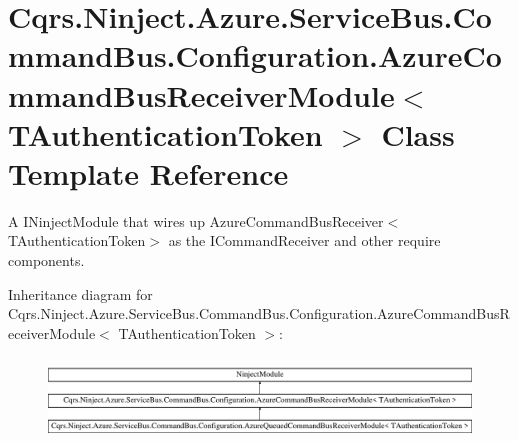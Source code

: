 \hypertarget{classCqrs_1_1Ninject_1_1Azure_1_1ServiceBus_1_1CommandBus_1_1Configuration_1_1AzureCommandBusReceiverModule}{}\section{Cqrs.\+Ninject.\+Azure.\+Service\+Bus.\+Command\+Bus.\+Configuration.\+Azure\+Command\+Bus\+Receiver\+Module$<$ T\+Authentication\+Token $>$ Class Template Reference}
\label{classCqrs_1_1Ninject_1_1Azure_1_1ServiceBus_1_1CommandBus_1_1Configuration_1_1AzureCommandBusReceiverModule}


A I\+Ninject\+Module that wires up Azure\+Command\+Bus\+Receiver$<$\+T\+Authentication\+Token$>$ as the I\+Command\+Receiver and other require components.  


Inheritance diagram for Cqrs.\+Ninject.\+Azure.\+Service\+Bus.\+Command\+Bus.\+Configuration.\+Azure\+Command\+Bus\+Receiver\+Module$<$ T\+Authentication\+Token $>$\+:\begin{figure}[H]
\begin{center}
\leavevmode
\includegraphics[height=2.231076cm]{classCqrs_1_1Ninject_1_1Azure_1_1ServiceBus_1_1CommandBus_1_1Configuration_1_1AzureCommandBusReceiverModule}
\end{center}
\end{figure}
